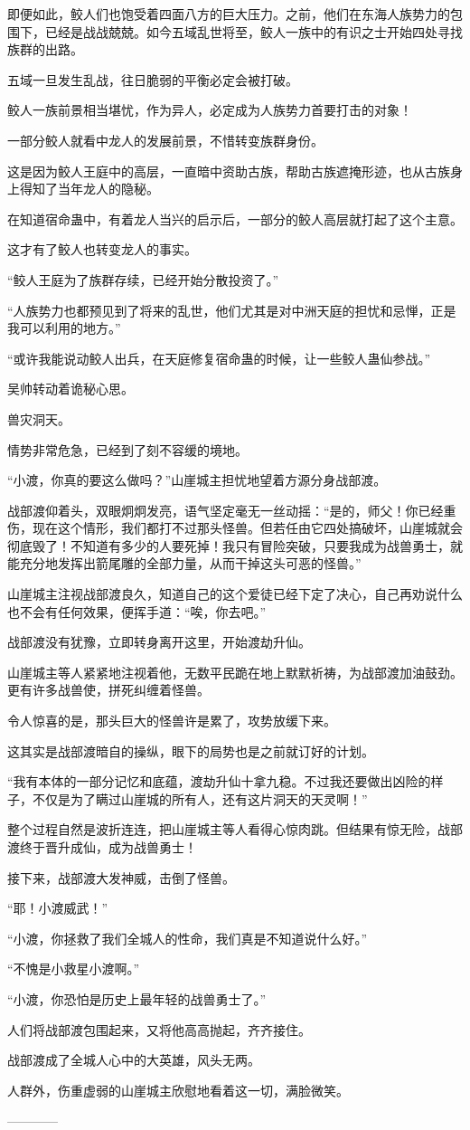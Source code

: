 \begin{this_body}
即便如此，鲛人们也饱受着四面八方的巨大压力。之前，他们在东海人族势力的包围下，已经是战战兢兢。如今五域乱世将至，鲛人一族中的有识之士开始四处寻找族群的出路。

五域一旦发生乱战，往日脆弱的平衡必定会被打破。

鲛人一族前景相当堪忧，作为异人，必定成为人族势力首要打击的对象！

一部分鲛人就看中龙人的发展前景，不惜转变族群身份。

这是因为鲛人王庭中的高层，一直暗中资助古族，帮助古族遮掩形迹，也从古族身上得知了当年龙人的隐秘。

在知道宿命蛊中，有着龙人当兴的启示后，一部分的鲛人高层就打起了这个主意。

这才有了鲛人也转变龙人的事实。

“鲛人王庭为了族群存续，已经开始分散投资了。”

“人族势力也都预见到了将来的乱世，他们尤其是对中洲天庭的担忧和忌惮，正是我可以利用的地方。”

“或许我能说动鲛人出兵，在天庭修复宿命蛊的时候，让一些鲛人蛊仙参战。”

吴帅转动着诡秘心思。

兽灾洞天。

情势非常危急，已经到了刻不容缓的境地。

“小渡，你真的要这么做吗？”山崖城主担忧地望着方源分身战部渡。

战部渡仰着头，双眼炯炯发亮，语气坚定毫无一丝动摇：“是的，师父！你已经重伤，现在这个情形，我们都打不过那头怪兽。但若任由它四处搞破坏，山崖城就会彻底毁了！不知道有多少的人要死掉！我只有冒险突破，只要我成为战兽勇士，就能充分地发挥出箭尾雕的全部力量，从而干掉这头可恶的怪兽。”

山崖城主注视战部渡良久，知道自己的这个爱徒已经下定了决心，自己再劝说什么也不会有任何效果，便挥手道：“唉，你去吧。”

战部渡没有犹豫，立即转身离开这里，开始渡劫升仙。

山崖城主等人紧紧地注视着他，无数平民跪在地上默默祈祷，为战部渡加油鼓劲。更有许多战兽使，拼死纠缠着怪兽。

令人惊喜的是，那头巨大的怪兽许是累了，攻势放缓下来。

这其实是战部渡暗自的操纵，眼下的局势也是之前就订好的计划。

“我有本体的一部分记忆和底蕴，渡劫升仙十拿九稳。不过我还要做出凶险的样子，不仅是为了瞒过山崖城的所有人，还有这片洞天的天灵啊！”

整个过程自然是波折连连，把山崖城主等人看得心惊肉跳。但结果有惊无险，战部渡终于晋升成仙，成为战兽勇士！

接下来，战部渡大发神威，击倒了怪兽。

“耶！小渡威武！”

“小渡，你拯救了我们全城人的性命，我们真是不知道说什么好。”

“不愧是小救星小渡啊。”

“小渡，你恐怕是历史上最年轻的战兽勇士了。”

人们将战部渡包围起来，又将他高高抛起，齐齐接住。

战部渡成了全城人心中的大英雄，风头无两。

人群外，伤重虚弱的山崖城主欣慰地看着这一切，满脸微笑。

------------

\end{this_body}

